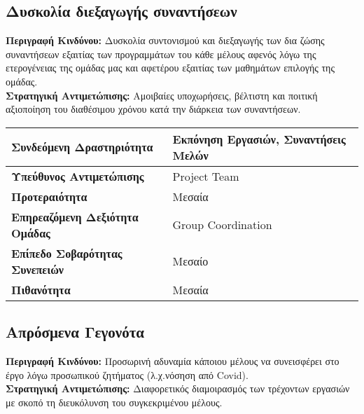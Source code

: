 \documentclass{article}
\newcommand\T{\rule{0pt}{2.6ex}}       %
\newcommand\B{\rule[-1.2ex]{0pt}{0pt}}
\begin{document}
 \subsection{Δυσκολία διεξαγωγής συναντήσεων}
 
 \textbf{Περιγραφή Κινδύνου:} Δυσκολία συντονισμού και διεξαγωγής των δια ζώσης συναντήσεων εξαιτίας των προγραμμάτων του κάθε μέλους αφενός λόγω της ετερογένειας της ομάδας μας και αφετέρου εξαιτίας των μαθημάτων επιλογής της ομάδας.\\
 
 \textbf{Στρατηγική Αντιμετώπισης:} Αμοιβαίες υποχωρήσεις, βέλτιστη και ποιτική αξιοποίηση του διαθέσιμου χρόνου κατά την διάρκεια των συναντήσεων.
 
 \vspace{0.2cm}
 
 \begin{center}
     \begin{tabular}{|l|l|}
     \hline
      \textbf{Συνδεόμενη Δραστηριότητα}   & Εκπόνηση Εργασιών, Συναντήσεις Μελών \T\B \\ 
      \hline
      \textbf{Υπεύθυνος Αντιμετώπισης} & Project Team \T\B \\
      \hline
      \textbf{Προτεραιότητα} & Μεσαία \T\B \\
      \hline
      \textbf{Επηρεαζόμενη Δεξιότητα Ομάδας} & Group Coordination \T\B \\
      \hline
      \textbf{Επίπεδο Σοβαρότητας Συνεπειών} & Μεσαίο \T\B \\
      \hline
      \textbf{Πιθανότητα} & Μεσαία \T\B \\
      \hline
     \end{tabular}
 \end{center}
 
 
 \subsection{Απρόσμενα Γεγονότα}
 
\textbf{Περιγραφή Κινδύνου:} Προσωρινή αδυναμία κάποιου μέλους να συνεισφέρει στο έργο λόγω προσωπικού ζητήματος (λ.χ.νόσηση από Covid). \\

\textbf{Στρατηγική Αντιμετώπισης:} Διαφορετικός διαμοιρασμός των τρέχοντων εργασιών με σκοπό τη διευκόλυνση του συγκεκριμένου μέλους.

\vspace{0.2cm}
 
\end{document}
